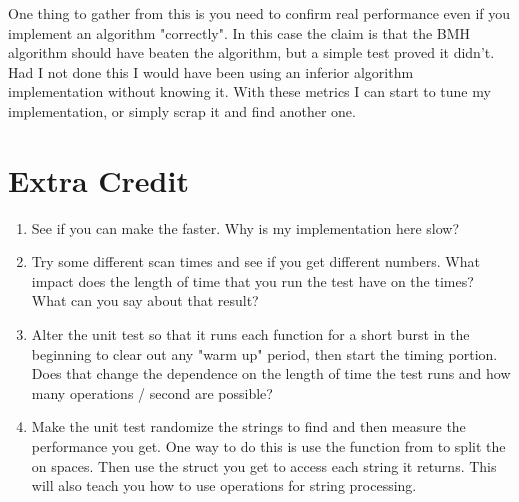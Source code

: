 One thing to gather from this is you need to confirm real performance even if
you implement an algorithm "correctly".  In this case the claim is that the BMH
algorithm should have beaten the  algorithm, but a simple test
proved it didn't.  Had I not done this I would have been using an inferior
algorithm implementation without knowing it.  With these metrics I can start to
tune my implementation, or simply scrap it and find another one.

\section{Extra Credit}

\begin{enumerate}
\item See if you can make the  faster.  Why is my implementation
    here slow?
\item Try some different scan times and see if you get different numbers.
    What impact does the length of time that you run the test have on
    the  times?  What can you say about that result?
\item Alter the unit test so that it runs each function for a short burst
    in the beginning to clear out any "warm up" period, then start the
    timing portion.  Does that change the dependence on the length of time
    the test runs and how many operations / second are possible?
\item Make the unit test randomize the strings to find and then measure
    the performance you get.  One way to do this is use the 
    function from  to split the  on 
    spaces.  Then use the  struct you get to access each
    string it returns.  This will also teach you how to use 
    operations for string processing.
\end{enumerate}

